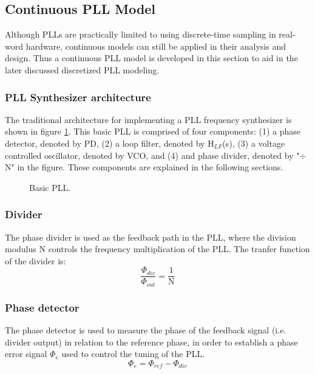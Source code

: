 	\subsection{Continuous PLL Model}
		Although PLLs are practically limited to using discrete-time sampling in real-word hardware, continuous models can still be applied in their analysis and design. Thus a continuous PLL model is developed in this section to aid in the later discussed discretized PLL modeling.

		\subsubsection{PLL Synthesizer architecture}
			The traditional architecture for implementing a PLL frequency synthesizer \cite{Razavi1996DesignOM} is shown in figure \ref{fig:basic_pll}. This basic PLL is comprised of four components: (1) a phase detector, denoted by PD, (2) a loop filter, denoted by H$_{LF}$(s), (3) a voltage controlled oscillator, denoted by VCO, and (4) and phase divider, denoted by "$\div$ N" in the figure. These components are explained in the following sections.
			\begin{figure}[htb!]
				\center
				\caption{Basic PLL.}
				\label{fig:basic_pll}
			\end{figure}
			\FloatBarrier

		\subsubsection{Divider}
			The phase divider is used as the feedback path in the PLL, where the division modulus N controls the frequency multiplication of the PLL. The tranfer function of the divider is:
			\begin{equation}
				\frac{\Phi_{div}}{\Phi_{out}} = \frac{1}{\mathrm{N}}
			\end{equation}
			\subsubsection{Phase detector}
			The phase detector is used to measure the phase of the feedback signal (i.e. divider output) in relation to the reference phase, in order to establish a phase error signal $\Phi_e$ used to control the tuning of the PLL.
			\begin{equation}
				\Phi_e = \Phi_{ref} - \Phi_{div}
			\end{equation}

